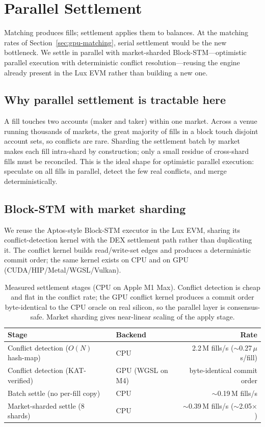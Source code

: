 \section{Parallel Settlement}
\label{sec:settlement}

Matching produces fills; settlement applies them to balances. At the matching rates of
Section~\ref{sec:gpu-matching}, serial settlement would be the new bottleneck. We settle in
parallel with market-sharded Block-STM---optimistic parallel execution with deterministic
conflict resolution---reusing the engine already present in the Lux EVM rather than building
a new one.

\subsection{Why parallel settlement is tractable here}

A fill touches two accounts (maker and taker) within one market. Across a venue running
thousands of markets, the great majority of fills in a block touch disjoint account sets, so
conflicts are rare. Sharding the settlement batch by market makes each fill intra-shard by
construction; only a small residue of cross-shard fills must be reconciled. This is the
ideal shape for optimistic parallel execution: speculate on all fills in parallel, detect
the few real conflicts, and merge deterministically.

\subsection{Block-STM with market sharding}

We reuse the Aptos-style Block-STM executor in the Lux EVM, sharing its conflict-detection
kernel with the DEX settlement path rather than duplicating it. The conflict kernel builds
read/write-set edges and produces a deterministic commit order; the same kernel exists on
CPU and on GPU (CUDA/HIP/Metal/WGSL/Vulkan).

\begin{table}[H]
\centering
\renewcommand{\arraystretch}{1.25}
\begin{tabular}{l l r}
\toprule
\textbf{Stage} & \textbf{Backend} & \textbf{Rate} \\
\midrule
Conflict detection ($O(N)$ hash-map) & CPU & 2.2\,M fills/s ($\sim$0.27\,$\mu$s/fill) \\
Conflict detection (KAT-verified)    & GPU (WGSL on M4) & byte-identical commit order \\
Batch settle (no per-fill copy)      & CPU & $\sim$0.19\,M fills/s \\
Market-sharded settle (8 shards)     & CPU & $\sim$0.39\,M fills/s ($\sim$2.05$\times$) \\
\bottomrule
\end{tabular}
\caption{Measured settlement stages (CPU on Apple M1 Max). Conflict detection is cheap and
flat in the conflict rate; the GPU conflict kernel produces a commit order byte-identical to
the CPU oracle on real silicon, so the parallel layer is consensus-safe. Market sharding
gives near-linear scaling of the apply stage.}
\label{tab:settlement}
\end{table}

